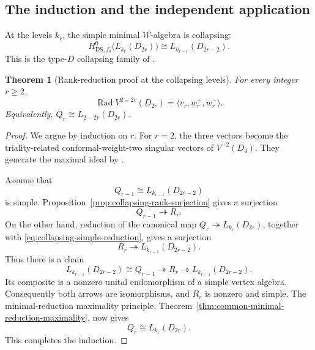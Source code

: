 \documentclass[11pt,reqno]{amsart}
\newtheorem{theorem}{Theorem}[section]
\theoremstyle{definition}
\theoremstyle{remark}
\begin{document}
\subsection{The induction and the independent application}


At the levels $k_r$, the simple minimal $W$-algebra is collapsing:
\begin{equation}
  H^0_{\mathrm{DS},f_\theta}
  \bigl(L_{k_r}(D_{2r})\bigr)
  \cong
  L_{k_{r-1}}(D_{2r-2}).
  \label{eq:collapsing-simple-reduction}
\end{equation}
This is the type-$D$ collapsing family of
\cite{AdamovicKacMosenederFrajriaPapiPerse2018,
AdamovicKacMosenederFrajriaPapiPerse2020}.

\begin{theorem}[Rank-reduction proof at the collapsing levels]
\label{thm:collapsing-rank-induction}
For every integer $r\ge2$,
\begin{equation}
  \operatorname{Rad}V^{2-2r}(D_{2r})
  =
  \langle v_r,w_r^+,w_r^-\rangle.
  \label{eq:collapsing-maximal-ideal}
\end{equation}
Equivalently,
$Q_r\cong L_{2-2r}(D_{2r})$.
\end{theorem}

\begin{proof}
We argue by induction on $r$.  For $r=2$, the three vectors become the
triality-related conformal-weight-two singular vectors of
$V^{-2}(D_4)$.  They generate the maximal ideal by
\cite[Theorem~4.2]{Perse2013}.

Assume that
\begin{equation*}
  Q_{r-1}\cong L_{k_{r-1}}(D_{2r-2})
\end{equation*}
is simple.  Proposition~\ref{prop:collapsing-rank-surjection} gives a
surjection
\begin{equation*}
  Q_{r-1}\twoheadrightarrow R_r.
\end{equation*}
On the other hand, reduction of the canonical map
$Q_r\twoheadrightarrow L_{k_r}(D_{2r})$, together with
\eqref{eq:collapsing-simple-reduction}, gives a surjection
\begin{equation*}
  R_r\twoheadrightarrow L_{k_{r-1}}(D_{2r-2}).
\end{equation*}
Thus there is a chain
\begin{equation*}
  L_{k_{r-1}}(D_{2r-2})
  \cong Q_{r-1}
  \twoheadrightarrow R_r
  \twoheadrightarrow L_{k_{r-1}}(D_{2r-2}).
\end{equation*}
Its composite is a nonzero unital endomorphism of a simple vertex algebra.
Consequently both arrows are isomorphisms, and $R_r$ is nonzero and
simple.  The minimal-reduction maximality principle,
Theorem~\ref{thm:common-minimal-reduction-maximality}, now gives
\begin{equation*}
  Q_r\cong L_{k_r}(D_{2r}).
\end{equation*}
This completes the induction.
\end{proof}
\end{document}
